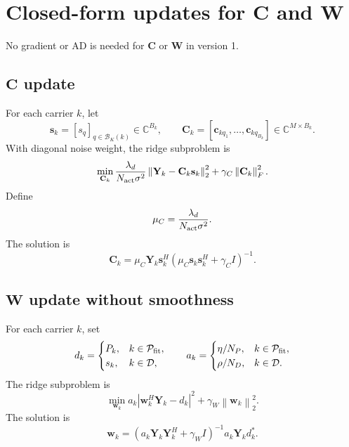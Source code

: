 \documentclass[11pt]{article}
\newcommand{\C}{\mathbb{C}}
\newcommand{\norm}[1]{\left\lVert #1 \right\rVert}
\newcommand{\abs}[1]{\left\lvert #1 \right\rvert}
\begin{document}
\section{Closed-form updates for $\mathbf C$ and $\mathbf W$}

No gradient or AD is needed for $\mathbf C$ or $\mathbf W$ in version 1.

\subsection{$\mathbf C$ update}

For each carrier $k$, let
\begin{equation}
\mathbf s_k=[s_q]_{q\in\mathcal B_K(k)}\in\C^{B_k},
\qquad
\mathbf C_k=[\mathbf c_{kq_1},\ldots,\mathbf c_{kq_{B_k}}]\in\C^{M\times B_k}.
\end{equation}
With diagonal noise weight, the ridge subproblem is
\begin{equation}
\min_{\mathbf C_k}
\frac{\lambda_d}{N_{\rm act}\sigma^2}
\norm{\mathbf Y_k-\mathbf C_k\mathbf s_k}_2^2
+\gamma_C\norm{\mathbf C_k}_F^2.
\end{equation}
Define
\begin{equation}
\mu_C=\frac{\lambda_d}{N_{\rm act}\sigma^2}.
\end{equation}
The solution is
\begin{equation}
\boxed{
\mathbf C_k
=\mu_C\mathbf Y_k\mathbf s_k^H
\left(\mu_C\mathbf s_k\mathbf s_k^H+\gamma_C I\right)^{-1}.}
\end{equation}

\subsection{$\mathbf W$ update without smoothness}

For each carrier $k$, set
\begin{equation}
d_k=\begin{cases}
P_k, & k\in\mathcal P_{\rm fit},\\
s_k, & k\in\mathcal D,
\end{cases}
\qquad
a_k=\begin{cases}
\eta/N_P, & k\in\mathcal P_{\rm fit},\\
\rho/N_D, & k\in\mathcal D.
\end{cases}
\end{equation}
The ridge subproblem is
\begin{equation}
\min_{\mathbf w_k}
a_k\abs{\mathbf w_k^H\mathbf Y_k-d_k}^2+\gamma_W\norm{\mathbf w_k}_2^2.
\end{equation}
The solution is
\begin{equation}
\boxed{
\mathbf w_k=
\left(a_k\mathbf Y_k\mathbf Y_k^H+\gamma_W I\right)^{-1}
a_k\mathbf Y_k d_k^*.}
\end{equation}
\end{document}
